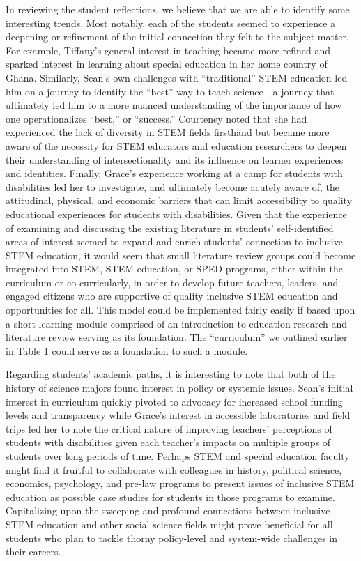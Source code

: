 \documentclass[11.5pt]{sig-alternate}
\begin{document}
\begin{large}
In reviewing the student reflections, we believe that we are able to identify some interesting trends.  Most notably, each of the students seemed to experience a deepening or refinement of the initial connection they felt to the subject matter.  For example, Tiffany’s general interest in teaching became more refined and sparked interest in learning about special education in her home country of Ghana.  Similarly, Sean’s own challenges with “traditional” STEM education led him on a journey to identify the “best” way to teach science - a journey that ultimately led him to a more nuanced understanding of the importance of how one operationalizes “best,” or “success.”  Courteney noted that she had experienced the lack of diversity in STEM fields firsthand but became more aware of the necessity for STEM educators and education researchers to deepen their understanding of intersectionality and its influence on learner experiences and identities.  Finally, Grace’s experience working at a camp for students with disabilities led her to investigate, and ultimately become acutely aware of, the attitudinal, physical, and economic barriers that can limit accessibility to quality educational experiences for students with disabilities.  Given that the experience of examining and discussing the existing literature in students’ self-identified areas of interest seemed to expand and enrich students’ connection to inclusive STEM education, it would seem that small literature review groups could become integrated into STEM, STEM education, or SPED programs, either within the curriculum or co-curricularly, in order to develop future teachers, leaders, and engaged citizens who are supportive of quality inclusive STEM education and opportunities for all.  This model could be implemented fairly easily if based upon a short learning module comprised of an introduction to education research and literature review serving as its foundation.  The “curriculum” we outlined earlier in Table 1 could serve as a foundation to such a module.  

Regarding students’ academic paths, it is interesting to note that both of the history of science majors found interest in policy or systemic issues.  Sean’s initial interest in curriculum quickly pivoted to advocacy for increased school funding levels and transparency while Grace’s interest in accessible laboratories and field trips led her to note the critical nature of improving teachers’ perceptions of students with disabilities given each teacher’s impacts on multiple groups of students over long periods of time.  Perhaps STEM and special education faculty might find it fruitful to collaborate with colleagues in history, political science, economics, psychology, and pre-law programs to present issues of inclusive STEM education as possible case studies for students in those programs to examine. Capitalizing upon the sweeping and profound connections between inclusive STEM education and other social science fields might prove beneficial for all students who plan to tackle thorny policy-level and system-wide challenges in their careers. 


\end{large}
\end{document}
